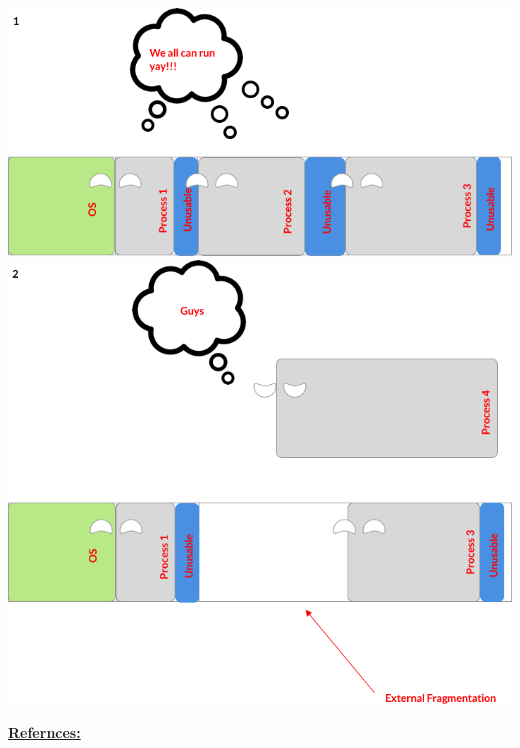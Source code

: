 \documentclass[12pt]{article}
\begin{document}
\begin{itemize}
    \begin{center}
    \includegraphics[width=0.8\linewidth]{images/week_5_notes_1_5.png}
    \includegraphics[width=0.8\linewidth]{images/week_5_notes_1_6.png}
    \end{center}

    \underline{\textbf{Refernces:}}

    \bigskip


\end{itemize}
\end{document}
